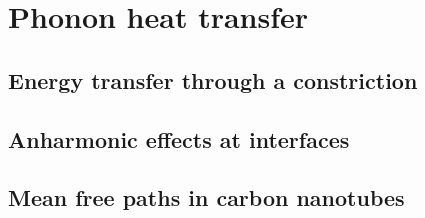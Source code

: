 

\section{Phonon heat transfer}


\subsection{Energy transfer through a constriction} 

\subsection{Anharmonic effects at interfaces}

\subsection{Mean free paths in carbon nanotubes}



